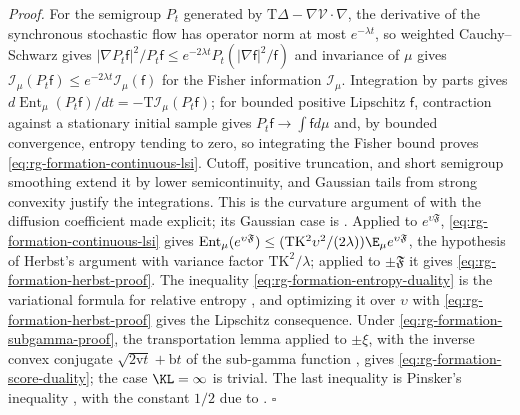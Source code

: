 \noindent\emph{Proof.}
For the semigroup \(P_t\) generated by
\(\mathrm T\Delta-\nabla\mathcal V\cdot\nabla\), the derivative of the
synchronous stochastic flow has operator norm at most \(e^{-\lambda t}\), so
weighted Cauchy--Schwarz gives
\(|\nabla P_t\mathsf f|^2/P_t\mathsf f\le e^{-2\lambda t}P_t(|\nabla\mathsf f|^2/\mathsf f)\)
and invariance of \(\mu\) gives
\(\mathcal I_\mu(P_t\mathsf f)\le e^{-2\lambda t}\mathcal I_\mu(\mathsf f)\) for
the Fisher information \(\mathcal I_\mu\). Integration by parts gives
\(d\operatorname{Ent}_\mu(P_t\mathsf f)/dt=-\mathrm T\mathcal I_\mu(P_t\mathsf f)\);
for bounded positive Lipschitz \(\mathsf f\), contraction against a stationary
initial sample gives \(P_t\mathsf f\to\int\mathsf f d\mu\) and, by bounded
convergence, entropy tending to zero, so integrating the Fisher bound proves
\cref{eq:rg-formation-continuous-lsi}. Cutoff, positive truncation, and short
semigroup smoothing extend it by lower semicontinuity, and Gaussian tails from
strong convexity justify the integrations. This is the curvature argument of
\citet[pp.~187, 194--200]{BakryEmery1985} with the diffusion coefficient made
explicit; its Gaussian case is \citet[Thm.~5.4]{BoucheronLugosiMassart2013}.
Applied to \(e^{\upsilon\mathfrak F}\), \cref{eq:rg-formation-continuous-lsi}
gives \(\operatorname{Ent}_\mu(e^{\upsilon\mathfrak F})\le
(\mathrm T\mathrm K^2\upsilon^2/(2\lambda))\E_\mu e^{\upsilon\mathfrak F}\), the
hypothesis of Herbst's argument \citep[Prop.~6.1]{BoucheronLugosiMassart2013}
with variance factor \(\mathrm T\mathrm K^2/\lambda\); applied to
\(\pm\mathfrak F\) it gives \cref{eq:rg-formation-herbst-proof}. The inequality
\cref{eq:rg-formation-entropy-duality} is the variational formula for relative
entropy \citep[Cor.~4.15]{BoucheronLugosiMassart2013}, and optimizing it over
\(\upsilon\) with \cref{eq:rg-formation-herbst-proof} gives the Lipschitz
consequence. Under \cref{eq:rg-formation-subgamma-proof}, the transportation
lemma \citep[Lemma~4.18]{BoucheronLugosiMassart2013} applied to \(\pm\xi\),
with the inverse convex conjugate \(\sqrt{2\mathrm vt}+\mathrm bt\) of the
sub-gamma function \citep[Sec.~2.4]{BoucheronLugosiMassart2013}, gives
\cref{eq:rg-formation-score-duality}; the case \(\KL=\infty\) is trivial. The
last inequality is Pinsker's inequality
\citep[Thm.~4.19]{BoucheronLugosiMassart2013}, with the constant \(1/2\) due to
\citet{Csiszar1967}. \hfill\(\square\)

